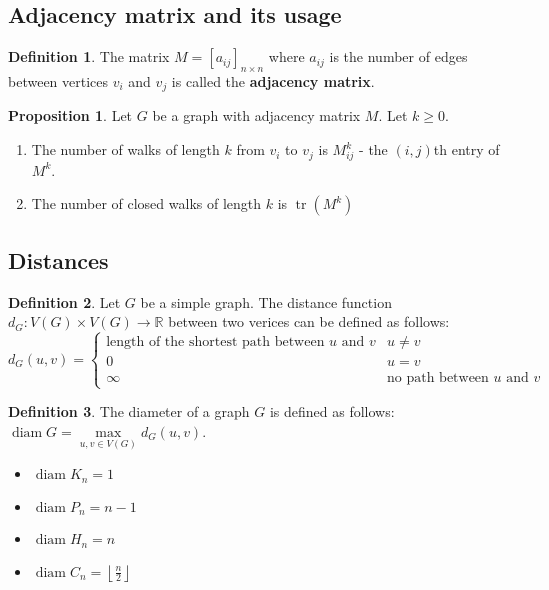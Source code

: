 \documentclass{article}
\theoremstyle{definition}
\newtheorem{prop}{Proposition}[section]
\newtheorem{dd}{Definition}[section]
\DeclareMathOperator{\tr}{tr}
\DeclareMathOperator{\diam}{diam}
\begin{document}
\subsection{Adjacency matrix and its usage}

\begin{dd}
    The matrix $M = [a_{ij}]_{n \times n}$ where $a_{ij}$ is the number of edges between vertices $v_i$ and $v_j$ is called the \textbf{adjacency matrix}.
\end{dd}

\begin{prop}
    Let $G$ be a graph with adjacency matrix $M$. Let $k \geq 0$.
    \begin{enumerate}
        \item The number of walks of length $k$ from $v_i$ to $v_j$ is $M^k_{ij}$ - the $(i, j)$th entry of $M^k$.
        \item The number of closed walks of length $k$ is $\tr(M^k)$
    \end{enumerate}
\end{prop}

\subsection{Distances}

\begin{dd}
    Let $G$ be a simple graph. The distance function $d_G: V(G) \times V(G) \to \mathbb{R}$ between two verices can be defined as follows: \\
    $d_G(u, v) = \begin{cases}
        \text{length of the shortest path between $u$ and $v$} & u \neq v \\
        0 & u = v \\
        \infty & \text{no path between $u$ and $v$}
    \end{cases}$
\end{dd}

\begin{dd}
    The diameter of a graph $G$ is defined as follows: $\diam G = \max\limits_{u, v \in V(G)} d_G(u, v)$.
    \begin{itemize}
        \item $\diam K_n = 1$
        \item $\diam P_n = n - 1$
        \item $\diam H_n = n$
        \item $\diam C_n = \left\lfloor \frac{n}{2} \right\rfloor$
    \end{itemize}
\end{dd}
\end{document}
